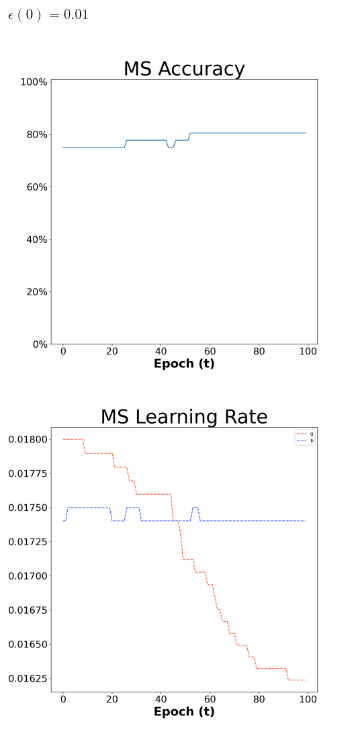 \begin{figure}[H]
\begin{subfigure}{0.3\textwidth}
  \caption{$\epsilon(0)=0.01$}
\end{subfigure}\hfil %
\begin{subfigure}{0.3\textwidth}
  \includegraphics[width=\linewidth]{images/exper1/Ionosphere/MS_0.03_acc.png}
  \includegraphics[width=\linewidth]{images/exper1/Ionosphere/MS_0.03_lr.png}

\end{subfigure}
\end{figure}
